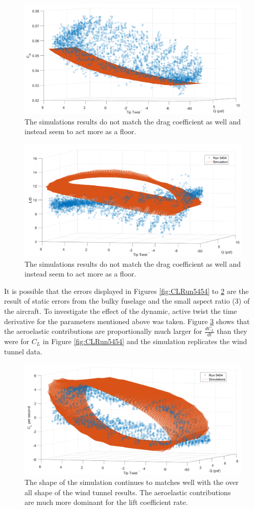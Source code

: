 \documentclass[11pt]{ucthesis}
\begin{document}
\begin{figure}[thpb]
\centering
\includegraphics[width=.75\linewidth]{Figures/CD5454.png}
\caption{The simulations results do not match the drag coefficient as well and instead seem to act more as a floor.}
\label{fig:CDRun5454}
\end{figure}

\begin{figure}[thpb]
\centering
\includegraphics[width=.75\linewidth]{Figures/LD5454.png}
\caption{The simulations results do not match the drag coefficient as well and instead seem to act more as a floor.}
\label{fig:LDRun5454}
\end{figure}

It is possible that the errors displayed in Figures \ref{fig:CLRun5454} to \ref{fig:LDRun5454} are the result of static errors from the bulky fuselage and the small aspect ratio (3) of the aircraft. To investigate the effect of the dynamic, active twist the time derivative for the parameters mentioned above was taken. Figure \ref{fig:dCLdtRun5454} shows that the aeroelastic contributions are proportionally much larger for $\frac{dC_L}{dt}$ than they were for $C_L$ in Figure \ref{fig:CLRun5454} and the simulation replicates the wind tunnel data.

\begin{figure}[thpb]
\centering
\includegraphics[width=.75\linewidth]{Figures/diffCL5454.png}
\caption{The shape of the simulation continues to matches well with the over all shape of the wind tunnel results. The aeroelastic contributions are much more dominant for the lift coefficient rate.}
\label{fig:dCLdtRun5454}
\end{figure}
\end{document}
